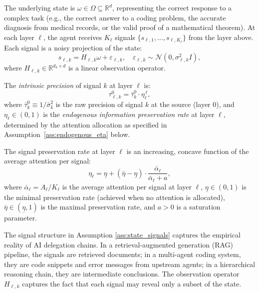 \begin{assumption}\label{ass:state_signals}
The underlying state is $\omega \in \Omega \subseteq \mathbb{R}^d$, representing the correct response to a complex task (e.g., the correct answer to a coding problem, the accurate diagnosis from medical records, or the valid proof of a mathematical theorem). At each layer $\ell$, the agent receives $K_\ell$ signals $\{s_{\ell,1}, \ldots, s_{\ell,K_\ell}\}$ from the layer above. Each signal is a noisy projection of the state:
\begin{equation}\label{eq:signal_structure}
s_{\ell,k} = H_{\ell,k} \omega + \varepsilon_{\ell,k}, \quad \varepsilon_{\ell,k} \sim \mathcal{N}(0, \sigma_{\ell,k}^2 I),
\end{equation}
where $H_{\ell,k} \in \mathbb{R}^{d_k \times d}$ is a linear observation operator.

The \emph{intrinsic precision} of signal $k$ at layer $\ell$ is:
\begin{equation}\label{eq:information_depreciation}
\tau^0_{\ell,k} = \bar{\tau}^0_k \cdot \eta_{\ell}^{\,\ell},
\end{equation}
where $\bar{\tau}^0_k \equiv 1/\bar{\sigma}_k^2$ is the raw precision of signal $k$ at the source (layer $0$), and $\eta_\ell \in (0,1)$ is the \emph{endogenous information preservation rate} at layer $\ell$, determined by the attention allocation as specified in Assumption~\ref{ass:endogenous_eta} below.
\end{assumption}

\begin{assumption}\label{ass:endogenous_eta}
The signal preservation rate at layer $\ell$ is an increasing, concave function of the average attention per signal:
\begin{equation}\label{eq:endogenous_eta}
\eta_\ell = \underline{\eta} + (\bar{\eta} - \underline{\eta}) \cdot \frac{\bar{\alpha}_\ell}{\bar{\alpha}_\ell + a},
\end{equation}
where $\bar{\alpha}_\ell = A_\ell / K_\ell$ is the average attention per signal at layer $\ell$, $\underline{\eta} \in (0,1)$ is the minimal preservation rate (achieved when no attention is allocated), $\bar{\eta} \in (\underline{\eta}, 1)$ is the maximal preservation rate, and $a > 0$ is a saturation parameter.
\end{assumption}

The signal structure in Assumption \ref{ass:state_signals} captures the empirical reality of AI delegation chains. In a retrieval-augmented generation (RAG) pipeline, the signals are retrieved documents; in a multi-agent coding system, they are code snippets and error messages from upstream agents; in a hierarchical reasoning chain, they are intermediate conclusions. The observation operator $H_{\ell,k}$ captures the fact that each signal may reveal only a subset of the state.

